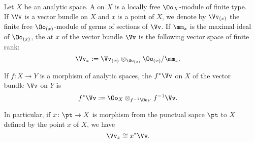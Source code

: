 \begin{para}
  Let $X$ be an analytic space. A  on $X$ is
  a locally free $\Oo_X$-module of finite type. If $\Vv$ is a vector bundle on
  $X$ and $x$ is a point of $X$,
  we denote by $\Vv_{(x)}$ the finite free $\Oo_{(x)}$-module
  of germs of sections of $\Vv$. If $\mm_x$ is the maximal ideal of $\Oo_{(x)}$,
  the  at $x$ of the vector bundle $\Vv$ is
  the following vector space of finite rank:
  \[
  \Vv_x:=\Vv_{(x)}\otimes_{\Oo_{(x)}}\Oo_{(x)}/\mm_x.
  \]

  If $f\colon X\to Y$ is a morphism of analytic spaces,
  the  $f^\ast\Vv$ on $X$
  of the vector bundle $\Vv$ on $Y$ is
  \[
  f^\ast\Vv:=\Oo_X\otimes_{f^{-1}\Oo_Y}f^{-1}\Vv.
  \]

  In particular, if $x\colon\pt\to X$ is morphism from the punctual sapce $\pt$
  to $X$ defined by the point $x$ of $X$, we have
  \[
  \Vv_x\cong x^\ast\Vv.
  \]
\end{para}

